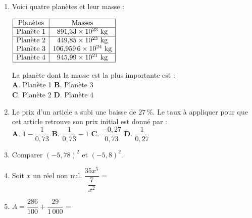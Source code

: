 \documentclass[a4paper,11pt]{article}
\begin{document}
\newpage


\begin{seance}{} %

\begin{enumerate}
\item Voici quatre planètes et leur masse : \\
\begin{minipage}[c]{0.4\textwidth}
$\renewcommand{\arraystretch}{1}
\begin{array}{|c|c|}
\hline
 \text{Planètes} &  \text{Masses}\\
\hline
 \text{Planète 1} & 891{,}33\times 10^{23}\text{ kg}\\
\hline
\text{Planète 2} & 449{,}85\times 10^{23}\text{ kg}\\
\text{Planète 3} & 106{,}959\,6\times 10^{24}\text{ kg}\\
\hline
\text{Planète 4} & 945{,}99\times 10^{21}\text{ kg}\\
\hline
 \end{array}
\renewcommand{\arraystretch}{1}$
\end{minipage} \hfill  \begin{minipage}[c]{0.6\textwidth}
La planète dont la masse est la plus importante est : \\
\textbf{A}. Planète 1 \quad \textbf{B}. Planète 3 \\
\textbf{C}. Planète 2 \quad \textbf{D}. Planète 4

\end{minipage}
\item Le prix d'un article a subi une baisse de $27\,\%$. Le taux à appliquer pour que cet article retrouve son prix initial est donné par : \\
\textbf{A}. $1-\dfrac{1}{0{,}73}$ \quad \textbf{B}. $\dfrac{1}{0{,}73}-1$ \quad \textbf{C}. $\dfrac{-0{,}27}{0{,}73}$ \quad \textbf{D}. $\dfrac{1}{0{,}27}$


\item Comparer $(-5{,}78)^2$ et $(-5{,}8)^2$.


\item Soit $x$ un réel non nul. $\dfrac{35x^{5}}{\dfrac{7}{x^2}}$ = \dotfill



\item $A=\dfrac{286}{100}+\dfrac{29}{1\,000}$ = \dotfill

\end{enumerate}

\end{seance}
\end{document}
